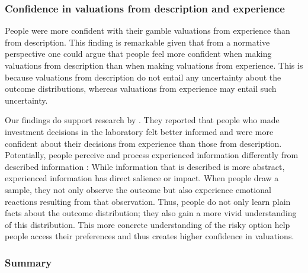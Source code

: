 \documentclass[a4paper, man, natbib, floatsintext]{apa6}
\begin{document}
\subsubsection{Confidence in valuations from description and experience}
People were more confident with their gamble valuations from experience than from description. This finding is remarkable given that from a normative perspective one could argue that people feel more confident when making valuations from description than when making valuations from experience. This is because valuations from description do not entail any uncertainty about the outcome distributions, whereas valuations from experience may entail such uncertainty.

Our findings do support research by \cite{Bradbury2014}. They reported that people who made investment decisions in the laboratory felt better informed and were more confident about their decisions from experience than those from description.
Potentially, people perceive and process experienced information differently from described information \citep{Kahneman2009}: 
While information that is described is more abstract, experienced information has direct salience or impact. When people draw a sample, they not only observe the outcome but also experience emotional reactions resulting from that observation. Thus, people do not only learn plain facts about the outcome distribution; they also gain a more vivid understanding of this distribution. This more concrete understanding of the risky option  help people access their preferences and thus creates higher confidence in valuations.

\subsubsection{Summary}



\end{document}

